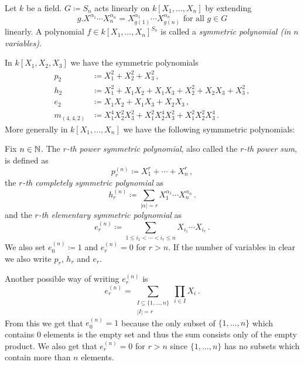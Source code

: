 \begin{defi}
  Let $k$ be a field.
  $G \coloneqq S_n$ acts linearly on $k[X_1, \dotsc, X_n]$ by extending
  \[
      g.X^{\alpha_1} \dotsm X_n^{\alpha_n}
    = X_{g(1)}^{\alpha_1} \dotsm X_{g(n)}^{\alpha_n}
    \text{ for all }
    g \in G
  \]
  linearly.
  A polynomial $f \in k[X_1, \dotsc, X_n]^{S_n}$ is called a \emph{symmetric polynomial (in $n$ variables)}.
\end{defi}


\begin{expl}
  In $k[X_1, X_2, X_3]$ we have the symmetric polynomials
  \begin{align*}
                p_2
    &\coloneqq  X_1^2 + X_2^2 + X_3^2 \,,
    \\
                h_2
    &\coloneqq  X_1^2 + X_1 X_2 + X_1 X_3 + X_2^2 + X_2 X_3 + X_3^2 \,,
    \\
                e_2
    &\coloneqq  X_1 X_2 + X_1 X_3 + X_2 X_3 \,,
    \\
                m_{(4,4,2)}
    &\coloneqq  X_1^4 X_2^2 X_3^2 + X_1^2 X_2^4 X_3^2 + X_1^2 X_2^2 X_3^4 \,.
  \end{align*}
  More generally in $k[X_1, \dotsc, X_n]$ we have the following symmmetric polynomials:
\end{expl}


\begin{defi}
  Fix $n \in \mathbb{N}$.
  The \emph{$r$-th power symmetric polynomial}, also called the \emph{$r$-th power sum}, is defined as
  \[
              p_r^{(n)}
    \coloneqq X_1^r + \dotsb + X_n^r \,,
  \]
  the \emph{$r$-th completely symmetric polynomial} as
  \[
              h_r^{(n)}
    \coloneqq \sum_{|\alpha|=r} X_1^{\alpha_1} \dotsm X_n^{\alpha_n} \,.
  \]
  and the \emph{$r$-th elementary symmetric polynomial} as
  \[
              e_r^{(n)}
    \coloneqq \sum_{1 \leq i_1 < \dotsb < i_r \leq n} X_{i_1} \dotsm X_{i_r} \,.
  \]
  We also set $e_0^{(n)} \coloneqq 1$ and $e_r^{(n)} = 0$ for $r > n$.
  If the number of variables in clear we also write $p_r$, $h_r$ and $e_r$.
\end{defi}

Another possible way of writing $e^{(n)}_r$ is
\[
    e^{(n)}_r
  = \sum_{\substack{I \subseteq \{1, \dotsc, n\} \\ |I| = r}} \prod_{i \in I} X_i \,.
\]
From this we get that $e^{(n)}_0 = 1$ because the only subset of $\{1, \dotsc, n\}$ which contains $0$ elements is the empty set and thus the sum consists only of the empty product.
We also get that $e^{(n)}_r = 0$ for $r > n$ since $\{1, \dotsc, n\}$ has no subsets which contain more than $n$ elements.

